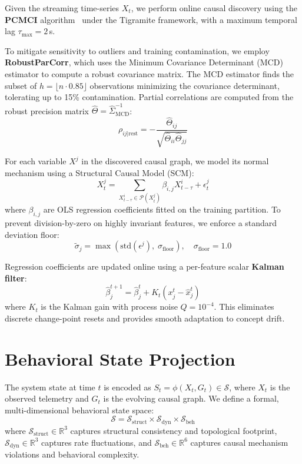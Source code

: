 Given the streaming time-series $X_t$, we perform online causal discovery using the
\textbf{PCMCI} algorithm~\cite{pcmci2019} under the Tigramite framework, with a maximum
temporal lag $\tau_{\max} = 2$\,s.

To mitigate sensitivity to outliers and training contamination, we employ \textbf{RobustParCorr},
which uses the Minimum Covariance Determinant (MCD) estimator to compute a robust covariance
matrix. The MCD estimator finds the subset of $h = \lfloor n \cdot 0.85 \rfloor$ observations
minimizing the covariance determinant, tolerating up to 15\% contamination. Partial correlations
are computed from the robust precision matrix $\hat{\Theta} = \hat{\Sigma}_{\text{MCD}}^{-1}$:
\begin{equation}
\rho_{ij|\text{rest}} = -\frac{\hat{\Theta}_{ij}}{\sqrt{\hat{\Theta}_{ii} \hat{\Theta}_{jj}}}
\end{equation}

For each variable $X^j$ in the discovered causal graph, we model its normal mechanism using
a Structural Causal Model (SCM):
\begin{equation}
X^j_t = \sum_{X^i_{t-\tau} \in \mathcal{P}(X^j_t)} \beta_{i,j} X^i_{t-\tau} + \epsilon^j_t
\end{equation}
where $\beta_{i,j}$ are OLS regression coefficients fitted on the training partition. To prevent
division-by-zero on highly invariant features, we enforce a standard deviation floor:
\begin{equation}
\tilde{\sigma}_j = \max\!\left(\text{std}(\epsilon^j),\; \sigma_{\text{floor}}\right),\quad
\sigma_{\text{floor}} = 1.0
\end{equation}

Regression coefficients are updated online using a per-feature scalar \textbf{Kalman filter}:
\begin{equation}
\hat{\beta}_j^{t+1} = \hat{\beta}_j^t + K_t (x_j^t - \hat{x}_j^t)
\end{equation}
where $K_t$ is the Kalman gain with process noise $Q = 10^{-4}$. This eliminates discrete
change-point resets and provides smooth adaptation to concept drift.


\section{Behavioral State Projection}
\label{sec:state_space}

The system state at time $t$ is encoded as $S_t = \phi(X_t, G_t) \in \mathcal{S}$, where $X_t$
is the observed telemetry and $G_t$ is the evolving causal graph. We define a formal,
multi-dimensional behavioral state space:
\begin{equation}
\mathcal{S} = \mathcal{S}_{\text{struct}} \times \mathcal{S}_{\text{dyn}} \times \mathcal{S}_{\text{beh}}
\end{equation}
where $\mathcal{S}_{\text{struct}} \in \mathbb{R}^3$ captures structural consistency and
topological footprint, $\mathcal{S}_{\text{dyn}} \in \mathbb{R}^3$ captures rate fluctuations,
and $\mathcal{S}_{\text{beh}} \in \mathbb{R}^6$ captures causal mechanism violations and
behavioral complexity.

